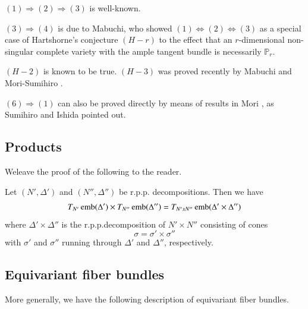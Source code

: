  \noindent
 $(1) \Rightarrow (2) \Rightarrow (3)$ is well-known. 
 
 \noindent
 $(3) \Rightarrow(4)$ is due to Mabuchi, who showed $(1)
 \Leftrightarrow (2) \Leftrightarrow (3)$ as a special case of
 Hartshorne's conjecture \cite{keyH1} $(H-r)$ to the effect that an
 $r$-dimensional non-singular complete variety with the ample tangent
 bundle is necessarily $\mathbb{P}_{r}$.  
 
 $(H-2)$ is known to be true. $(H-3)$ was proved recently by Mabuchi
 \cite{keyM1} and Mori-Sumihiro \cite{keyMS}. 
 
 \noindent
 $(6) \Rightarrow (1)$ can also be proved directly by means of results
 in Mori \cite{keyM4}, as Sumihiro and Ishida pointed out.  
 
 \subsection{Products}\label{chap1:subsec7.5} %
 We\pageoriginale leave the proof of the following to the reader. 

 \setcounter{prop}{1}
 \begin{prop}\label{chap1:prop7.2} %
Let $(N' , \Delta')$ and $(N'', \Delta'')$ be
r.p.p. decompositions. Then we have  
$$
T_{N'} \operatorname{emb} (\Delta') \times T_{N''} \operatorname{emb} (\Delta'') = T_{N' xN''} \operatorname{emb}
(\Delta' \times \Delta'') 
$$
where $\Delta' \times \Delta''$ is the r.p.p.decomposition of $N'
\times N''$
consisting of cones  
$$
\sigma = \sigma' \times \sigma''
$$
 with $\sigma'$ and $\sigma''$ running through $\Delta'$ and $\Delta''$,
 respectively.  
 \end{prop} 

 
 \subsection{Equivariant fiber bundles}\label{chap1:subsec7.6}
	
 More generally, we have the following description of equivariant
 fiber bundles.  
 
